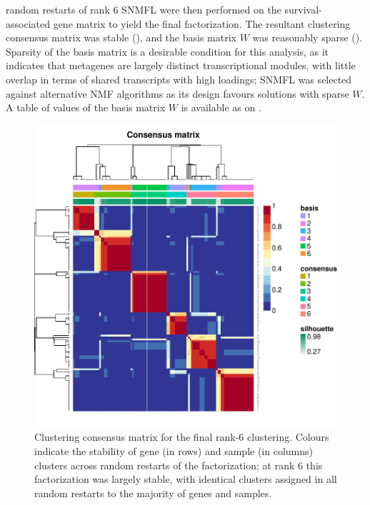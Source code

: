 \documentclass[dissertation.tex]{subfiles}
\begin{document}
 random restarts of rank 6 \gls{SNMFL} were then performed on the survival-associated gene matrix to yield the final factorization.  The resultant clustering consensus matrix was stable (), and the basis matrix $W$ was reasonably sparse ().  Sparsity of the basis matrix is a desirable condition for this analysis, as it indicates that metagenes are largely distinct transcriptional modules, with little overlap in terms of shared transcripts with high loadings; \gls{SNMFL} was selected against alternative \gls{NMF} algorithms as its design favours solutions with sparse $W$.  A table of values of the basis matrix $W$ is available as  on .

\begin{figure}[!htbp]
\centering
\includegraphics[width=.7\linewidth]{analysis/biosurv/reports/18_SIS_diag_dsd_final/figure/nmf-plots-1}
\caption[Consensus matrix for the final rank-6 clustering]{Clustering consensus matrix for the final rank-6 clustering.  Colours indicate the stability of gene (in rows) and sample (in columns) clusters across random restarts of the factorization; at rank 6 this factorization was largely stable, with identical clusters assigned in all  random restarts to the majority of genes and samples.}\label{fig:sigs-nmf-consensus}
\end{figure}
\end{document}
